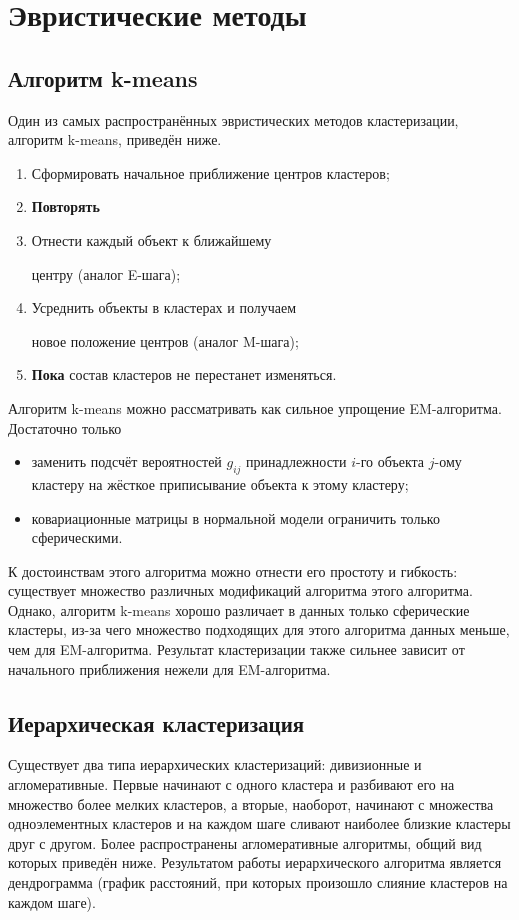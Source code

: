 \documentclass[10pt]{article}
\begin{document}
\section{Эвристические методы}
\subsection{Алгоритм k-means}
Один из самых распространённых эвристических методов кластеризации, алгоритм k-means, приведён ниже.
	\begin{enumerate}
	\item Сформировать начальное приближение центров кластеров;
	\item \textbf{Повторять}
	\item \quad  Отнести каждый объект к ближайшему 

		\quad центру (аналог E-шага);
	\item \quad  Усреднить объекты в кластерах и получаем 

	        \quad новое положение центров (аналог M-шага);
	\item \textbf{Пока} состав кластеров не перестанет изменяться.
	\end{enumerate}



	Алгоритм k-means можно рассматривать как сильное упрощение EM-алгоритма. Достаточно только
	\begin{itemize}
		\item заменить подсчёт вероятностей $g_{ij}$ принадлежности $i$-го объекта $j$-ому кластеру на жёсткое приписывание объекта к этому кластеру;
		\item ковариационные матрицы в нормальной модели ограничить только сферическими.
	\end{itemize}

К достоинствам этого алгоритма можно отнести его простоту и гибкость: существует множество различных модификаций алгоритма этого алгоритма. Однако, алгоритм k-means 
хорошо различает в данных только сферические кластеры, из-за чего множество подходящих для этого алгоритма данных меньше, чем для EM-алгоритма. Результат кластеризации
также сильнее зависит от начального приближения нежели для EM-алгоритма. 

\subsection{Иерархическая кластеризация}
Существует два типа иерархических кластеризаций: дивизионные и агломеративные. Первые начинают с одного кластера и разбивают его на множество более мелких кластеров, 
а вторые, наоборот, начинают с множества одноэлементных кластеров и на каждом шаге сливают наиболее близкие кластеры друг с другом.
Более распространены агломеративные алгоритмы, общий вид которых приведён ниже. 
Результатом работы иерархического алгоритма является дендрограмма (график расстояний, при которых произошло слияние кластеров на каждом шаге).
\end{document}
